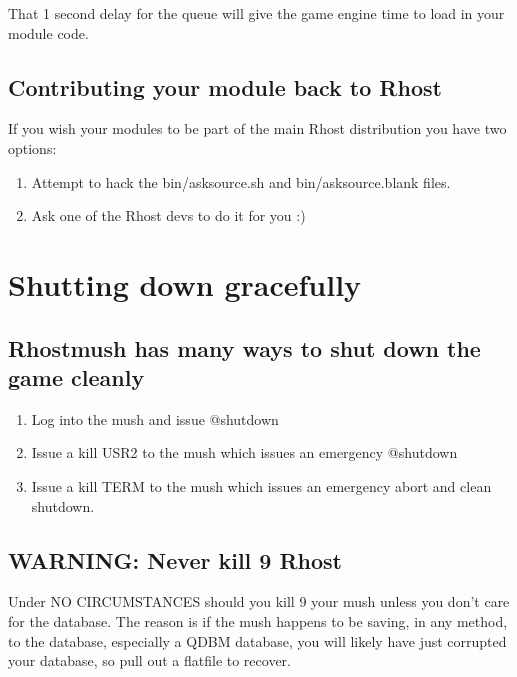 \documentclass[letterpaper,10pt,english]{sphinxmanual}
\begin{document}
\sphinxAtStartPar
That 1 second delay for the queue will give the game engine time to load in your module code.


\subsection{Contributing your module back to Rhost}
\label{\detokenize{advanced:contributing-your-module-back-to-rhost}}
\sphinxAtStartPar
If you wish your modules to be part of the main Rhost distribution you have two options:
\begin{enumerate}
%
\item {} 
\sphinxAtStartPar
Attempt to hack the bin/asksource.sh and bin/asksource.blank files.

\item {} 
\sphinxAtStartPar
Ask one of the Rhost devs to do it for you :)

\end{enumerate}


\section{Shutting down gracefully}
\label{\detokenize{advanced:shutting-down-gracefully}}

\subsection{Rhostmush has many ways to shut down the game cleanly}
\label{\detokenize{advanced:rhostmush-has-many-ways-to-shut-down-the-game-cleanly}}\begin{enumerate}
%
\item {} 
\sphinxAtStartPar
Log into the mush and issue @shutdown

\item {} 
\sphinxAtStartPar
Issue a kill \sphinxhyphen{}USR2 to the mush which issues an emergency @shutdown

\item {} 
\sphinxAtStartPar
Issue a kill \sphinxhyphen{}TERM to the mush which issues an emergency abort and clean shutdown.

\end{enumerate}


\subsection{WARNING: Never kill \sphinxhyphen{}9 Rhost}
\label{\detokenize{advanced:warning-never-kill-9-rhost}}
\sphinxAtStartPar
Under NO CIRCUMSTANCES should you kill \sphinxhyphen{}9 your mush unless you don’t care for the
database.  The reason is if the mush happens to be saving, in any method, to the
database, especially a QDBM database, you will likely have just corrupted your
database, so pull out a flatfile to recover.
\end{document}
